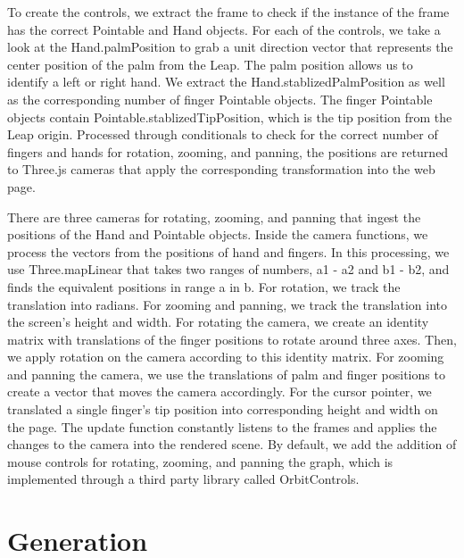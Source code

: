 \documentclass{vgtc}                          %
\begin{document}
To create the controls, we extract the frame to check if the instance of the frame has the correct Pointable and Hand objects. For each of the controls, we take a look at the Hand.palmPosition to grab a unit direction vector that represents the center position of the palm from the Leap. The palm position allows us to identify a left or right hand. We extract the Hand.stablizedPalmPosition as well as the corresponding number of finger Pointable objects. The finger Pointable objects contain Pointable.stablizedTipPosition, which is the tip position from the Leap origin. Processed through conditionals to check for the correct number of fingers and hands for rotation, zooming, and panning, the positions are returned to Three.js cameras that apply the corresponding transformation into the web page.

There are three cameras for rotating, zooming, and panning that ingest the positions of the Hand and Pointable objects. Inside the camera functions, we process the vectors from the positions of hand and fingers. In this processing, we use Three.mapLinear that takes two ranges of numbers, a1 - a2 and b1 - b2, and finds the equivalent positions in range a in b. For rotation, we track the translation into radians. For zooming and panning, we track the translation into the screen’s height and width. For rotating the camera, we create an identity matrix with translations of the finger positions to rotate around three axes. Then, we apply rotation on the camera according to this identity matrix. For zooming and panning the camera, we use the translations of palm and finger positions to create a vector that moves the camera accordingly. For the cursor pointer, we translated a single finger’s tip position into corresponding height and width on the page. The update function constantly listens to the frames and applies the changes to the camera into the rendered scene. By default, we add the addition of mouse controls for rotating, zooming, and panning the graph, which is implemented through a third party library called OrbitControls. 

\section{Generation}
\end{document}
